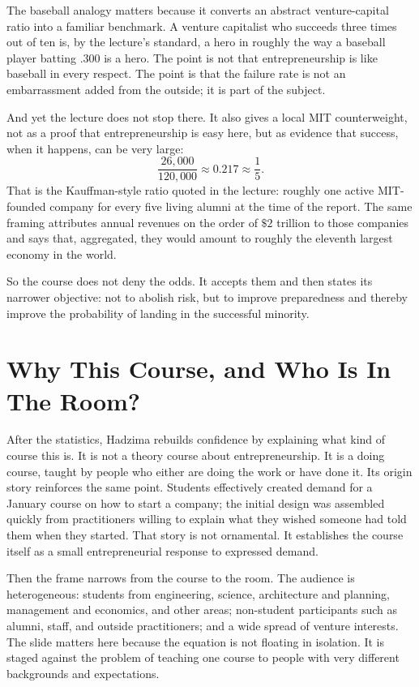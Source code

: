 The baseball analogy matters because it converts an abstract venture-capital ratio into a familiar benchmark. A venture capitalist who succeeds three times out of ten is, by the lecture's standard, a hero in roughly the way a baseball player batting .300 is a hero. The point is not that entrepreneurship is like baseball in every respect. The point is that the failure rate is not an embarrassment added from the outside; it is part of the subject.

And yet the lecture does not stop there. It also gives a local MIT counterweight, not as a proof that entrepreneurship is easy here, but as evidence that success, when it happens, can be very large:
\begin{equation}
\frac{26{,}000}{120{,}000} \approx 0.217 \approx \frac{1}{5}.
\end{equation}
That is the Kauffman-style ratio quoted in the lecture: roughly one active MIT-founded company for every five living alumni at the time of the report. The same framing attributes annual revenues on the order of \(\$2\) trillion to those companies and says that, aggregated, they would amount to roughly the eleventh largest economy in the world.

So the course does not deny the odds. It accepts them and then states its narrower objective: not to abolish risk, but to improve preparedness and thereby improve the probability of landing in the successful minority.

\section{Why This Course, and Who Is In The Room?}

After the statistics, Hadzima rebuilds confidence by explaining what kind of course this is. It is not a theory course about entrepreneurship. It is a doing course, taught by people who either are doing the work or have done it. Its origin story reinforces the same point. Students effectively created demand for a January course on how to start a company; the initial design was assembled quickly from practitioners willing to explain what they wished someone had told them when they started. That story is not ornamental. It establishes the course itself as a small entrepreneurial response to expressed demand.

Then the frame narrows from the course to the room. The audience is heterogeneous: students from engineering, science, architecture and planning, management and economics, and other areas; non-student participants such as alumni, staff, and outside practitioners; and a wide spread of venture interests. The slide matters here because the equation is not floating in isolation. It is staged against the problem of teaching one course to people with very different backgrounds and expectations.

